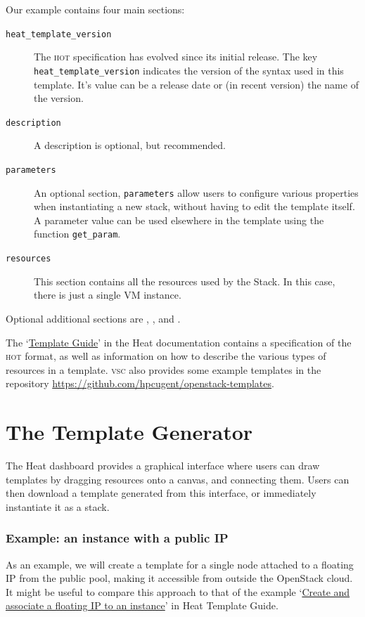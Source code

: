 Our example contains four main sections:
\begin{description}
\item[\texttt{heat\_template\_version}] The \textsc{hot} specification
  has evolved since its initial release.  The key
  \lstinline{heat_template_version} indicates the version of the
  syntax used in this template.  It's value can be a release date or
  (in recent version) the name of the version.
\item[\texttt{description}] A description is optional, but
  recommended.
\item[\texttt{parameters}] An optional section, \lstinline{parameters}
  allow users to configure various properties when instantiating a new
  stack, without having to edit the template itself.  A parameter
  value can be used elsewhere in the template using the function
  \lstinline{get_param}.
\item[\texttt{resources}] This section contains all the resources used
  by the Stack.  In this case, there is just a single VM instance.
\end{description}
Optional additional sections are ,
, and .

The
`\href{https://docs.openstack.org/heat/latest/template_guide}{Template
  Guide}' in the Heat documentation contains a specification of the
\textsc{hot} format, as well as information on how to describe the
various types of resources in a template.  \textsc{vsc} also provides
some example templates in the repository
\url{https://github.com/hpcugent/openstack-templates}.

\section{The Template Generator}\label{sec:template-generator}
The Heat dashboard provides a graphical interface where users can draw
templates by dragging resources onto a canvas, and connecting them.
Users can then download a template generated from this interface, or
immediately instantiate it as a stack.

\subsubsection{Example: an instance with a public IP}
As an example, we will create a template for a single node attached to
a floating IP from the public pool, making it accessible from outside
the OpenStack cloud.  It might be useful to compare this approach to
that of the example
`\href{https://docs.openstack.org/heat/latest/template_guide/basic_resources.html#create-and-associate-a-floating-ip-to-an-instance}{Create
  and associate a floating IP to an instance}' in Heat Template Guide.


